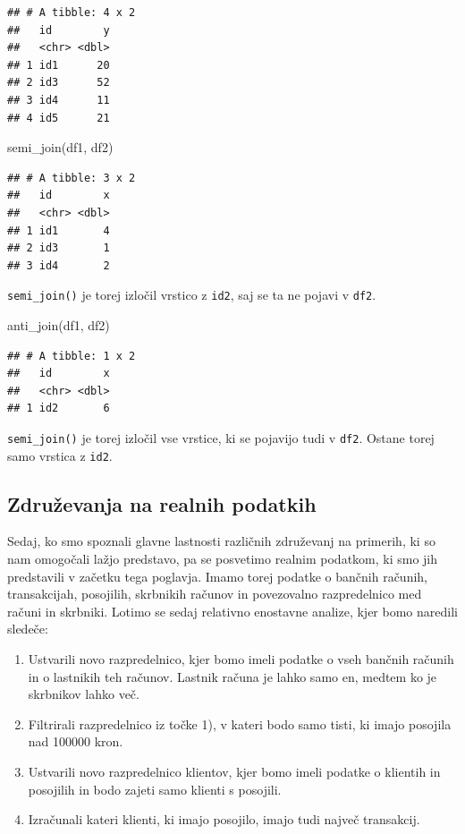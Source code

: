 \documentclass[
]{book}
\newenvironment{Shaded}{\begin{snugshade}}{\end{snugshade}}
\newcommand{\FunctionTok}[1]{\textcolor[rgb]{0.00,0.00,0.00}{#1}}
\newcommand{\NormalTok}[1]{#1}
\providecommand{\tightlist}{%
  \setlength{\itemsep}{0pt}\setlength{\parskip}{0pt}}
\begin{document}
\begin{verbatim}
## # A tibble: 4 x 2
##   id        y
##   <chr> <dbl>
## 1 id1      20
## 2 id3      52
## 3 id4      11
## 4 id5      21
\end{verbatim}

\begin{Shaded}
\begin{Highlighting}[]
\FunctionTok{semi\_join}\NormalTok{(df1, df2)}
\end{Highlighting}
\end{Shaded}

\begin{verbatim}
## # A tibble: 3 x 2
##   id        x
##   <chr> <dbl>
## 1 id1       4
## 2 id3       1
## 3 id4       2
\end{verbatim}

\texttt{semi\_join()} je torej izločil vrstico z \texttt{id2}, saj se ta ne pojavi v \texttt{df2}.

\begin{Shaded}
\begin{Highlighting}[]
\FunctionTok{anti\_join}\NormalTok{(df1, df2)}
\end{Highlighting}
\end{Shaded}

\begin{verbatim}
## # A tibble: 1 x 2
##   id        x
##   <chr> <dbl>
## 1 id2       6
\end{verbatim}

\texttt{semi\_join()} je torej izločil vse vrstice, ki se pojavijo tudi v \texttt{df2}. Ostane torej samo vrstica z \texttt{id2}.

\hypertarget{zdruux17eevanja-na-realnih-podatkih}{%
\subsection{Združevanja na realnih podatkih}\label{zdruux17eevanja-na-realnih-podatkih}}

Sedaj, ko smo spoznali glavne lastnosti različnih združevanj na primerih, ki so nam omogočali lažjo predstavo, pa se posvetimo realnim podatkom, ki smo jih predstavili v začetku tega poglavja. Imamo torej podatke o bančnih računih, transakcijah, posojilih, skrbnikih računov in povezovalno razpredelnico med računi in skrbniki. Lotimo se sedaj relativno enostavne analize, kjer bomo naredili sledeče:

\begin{enumerate}
\def\labelenumi{\arabic{enumi})}
\tightlist
\item
  Ustvarili novo razpredelnico, kjer bomo imeli podatke o vseh bančnih računih in o lastnikih teh računov. Lastnik računa je lahko samo en, medtem ko je skrbnikov lahko več.
\item
  Filtrirali razpredelnico iz točke 1), v kateri bodo samo tisti, ki imajo posojila nad 100000 kron.
\item
  Ustvarili novo razpredelnico klientov, kjer bomo imeli podatke o klientih in posojilih in bodo zajeti samo klienti s posojili.
\item
  Izračunali kateri klienti, ki imajo posojilo, imajo tudi največ transakcij.
\end{enumerate}
\end{document}
